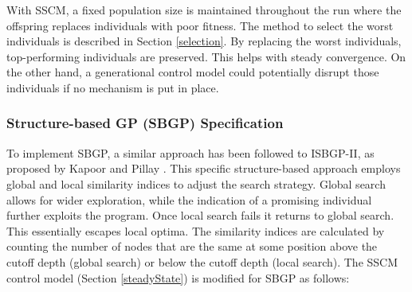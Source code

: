 \documentclass{article}
\begin{document}
With SSCM, a fixed population size is maintained throughout the run where the offspring replaces individuals with poor fitness. The method to select the worst individuals is described in Section \ref{selection}. By replacing the worst individuals, top-performing individuals are preserved. This helps with steady convergence. On the other hand, a generational control model could potentially disrupt those individuals if no mechanism is put in place.

\subsubsection{Structure-based GP (SBGP) Specification}
To implement SBGP, a similar approach has been followed to ISBGP-II, as proposed by Kapoor and Pillay \cite{kapoor_genetic_2024}. This specific structure-based approach employs global and local similarity indices to adjust the search strategy. Global search allows for wider exploration, while the indication of a promising individual further exploits the program. Once local search fails it returns to global search. This essentially escapes local optima. The similarity indices are calculated by counting the number of nodes that are the same at some position above the cutoff depth (global search) or below the cutoff depth (local search). The SSCM control model (Section \ref{steadyState}) is modified for SBGP as follows:
\end{document}
